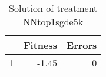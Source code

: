 \begin{table}[ht]
\centering
\begin{tabular}{rrr}
  \hline
 & Fitness & Errors \\ 
  \hline
1 & -1.45 &   0 \\ 
   \hline
\end{tabular}
\caption{Solution of treatment NNtop1sgde5k} 
\end{table}
